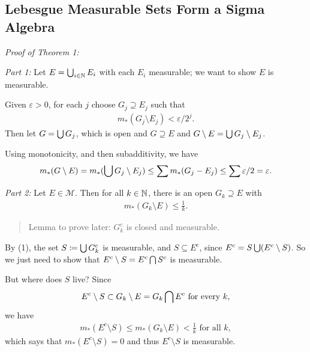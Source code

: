 \hypertarget{lebesgue-measurable-sets-form-a-sigma-algebra}{%
\subsection{Lebesgue Measurable Sets Form a Sigma
Algebra}\label{lebesgue-measurable-sets-form-a-sigma-algebra}}

\emph{Proof of Theorem 1:}

\emph{Part 1:} Let \(E = \bigcup_{i\in {\mathbb{N}}} E_i\) with each \(E_i\)
measurable; we want to show \(E\) is measurable.

Given \(\varepsilon > 0\), for each \(j\) choose \(G_j \supseteq E_j\)
such that
\begin{align*}
m_*(G_j \setminus E_j) < \varepsilon /2^j
.\end{align*} Then let \(G = \bigcup G_j\), which is open and
\(G \supseteq E\) and \(G\setminus E = \bigcup G_j\setminus E_j\).

Using monotonicity, and then subadditivity, we have
\begin{align*}
m_*(G\setminus E) =  m_*(\bigcup G_j \setminus E_j) \leq \sum m_*(G_j - E_j) \leq \sum \varepsilon /2 = \varepsilon.
\end{align*}

\emph{Part 2:} Let \(E \in \mathcal M\). Then for all \(k\in {\mathbb{N}}\),
there is an open \(G_k \supseteq E\) with
\begin{align*}
m_*(G_k\setminus E) \leq \frac 1 k
.\end{align*}

\begin{quote}
Lemma to prove later: \(G_k^c\) is closed and measurable.
\end{quote}

By (1), the set \(S \coloneqq \bigcup G_k^c\) is measurable, and
\(S \subseteq E^c\), since \(E^c = S \bigcup (E^c \setminus S)\). So we
just need to show that \(E^c \setminus S = E^c \bigcap S^c\) is
measurable.

But where does \(S\) live? Since
\begin{align*}
E^c \setminus S \subset G_k \setminus E = G_k \bigcap E^c \text{ for every } k
,\end{align*} we have
\begin{align*}
m_*(E^c \setminus S) \leq m_*(G_k\setminus E) < \frac 1 k \text{ for all } k
,\end{align*} which says that \(m_*(E^c\setminus S) = 0\) and thus
\(E^c \setminus S\) is measurable.

